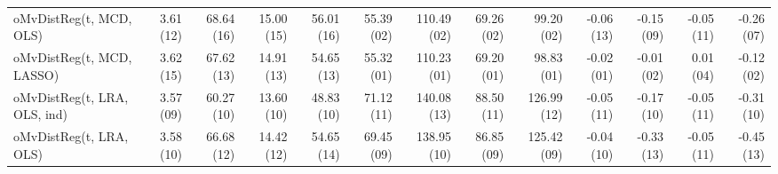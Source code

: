 \begin{tabular}{lrrrrrrrrrrrr}
oMvDistReg(t, MCD, OLS) & {\cellcolor[HTML]{D38E8E}} \color[HTML]{F1F1F1} 3.61 (12) & {\cellcolor[HTML]{CD5C5C}} \color[HTML]{F1F1F1} 68.64 (16) & {\cellcolor[HTML]{CD6060}} \color[HTML]{F1F1F1} 15.00 (15) & {\cellcolor[HTML]{CD5C5C}} \color[HTML]{F1F1F1} 56.01 (16) & {\cellcolor[HTML]{008080}} \color[HTML]{F1F1F1} 55.39 (02) & {\cellcolor[HTML]{028181}} \color[HTML]{F1F1F1} 110.49 (02) & {\cellcolor[HTML]{008080}} \color[HTML]{F1F1F1} 69.26 (02) & {\cellcolor[HTML]{038181}} \color[HTML]{F1F1F1} 99.20 (02) & {\cellcolor[HTML]{8ABABA}} \color[HTML]{000000} -0.06 (13) & {\cellcolor[HTML]{D7ADAD}} \color[HTML]{000000} -0.15 (09) & {\cellcolor[HTML]{D8BCBC}} \color[HTML]{000000} -0.05 (11) & {\cellcolor[HTML]{C0D0D0}} \color[HTML]{000000} -0.26 (07) \\
oMvDistReg(t, MCD, LASSO) & {\cellcolor[HTML]{D28888}} \color[HTML]{F1F1F1} 3.62 (15) & {\cellcolor[HTML]{CE6161}} \color[HTML]{F1F1F1} 67.62 (13) & {\cellcolor[HTML]{CE6464}} \color[HTML]{F1F1F1} 14.91 (13) & {\cellcolor[HTML]{CE6464}} \color[HTML]{F1F1F1} 54.65 (13) & {\cellcolor[HTML]{008080}} \color[HTML]{F1F1F1} 55.32 (01) & {\cellcolor[HTML]{008080}} \color[HTML]{F1F1F1} 110.23 (01) & {\cellcolor[HTML]{008080}} \color[HTML]{F1F1F1} 69.20 (01) & {\cellcolor[HTML]{008080}} \color[HTML]{F1F1F1} 98.83 (01) & {\cellcolor[HTML]{008080}} \color[HTML]{F1F1F1} -0.02 (01) & {\cellcolor[HTML]{429B9B}} \color[HTML]{F1F1F1} -0.01 (02) & {\cellcolor[HTML]{A9C7C7}} \color[HTML]{000000} 0.01 (04) & {\cellcolor[HTML]{289191}} \color[HTML]{F1F1F1} -0.12 (02) \\
oMvDistReg(t, LRA, OLS, ind) & {\cellcolor[HTML]{D8B6B6}} \color[HTML]{000000} 3.57 (09) & {\cellcolor[HTML]{D38D8D}} \color[HTML]{F1F1F1} 60.27 (10) & {\cellcolor[HTML]{D5A3A3}} \color[HTML]{000000} 13.60 (10) & {\cellcolor[HTML]{D38C8C}} \color[HTML]{F1F1F1} 48.83 (10) & {\cellcolor[HTML]{D7B0B0}} \color[HTML]{000000} 71.12 (11) & {\cellcolor[HTML]{DACDCD}} \color[HTML]{000000} 140.08 (13) & {\cellcolor[HTML]{D7B1B1}} \color[HTML]{000000} 88.50 (11) & {\cellcolor[HTML]{DBD2D2}} \color[HTML]{000000} 126.99 (12) & {\cellcolor[HTML]{6EAEAE}} \color[HTML]{F1F1F1} -0.05 (11) & {\cellcolor[HTML]{D6A7A7}} \color[HTML]{000000} -0.17 (10) & {\cellcolor[HTML]{D8BCBC}} \color[HTML]{000000} -0.05 (11) & {\cellcolor[HTML]{DBD5D5}} \color[HTML]{000000} -0.31 (10) \\
oMvDistReg(t, LRA, OLS) & {\cellcolor[HTML]{D6A6A6}} \color[HTML]{000000} 3.58 (10) & {\cellcolor[HTML]{CE6767}} \color[HTML]{F1F1F1} 66.68 (12) & {\cellcolor[HTML]{D17B7B}} \color[HTML]{F1F1F1} 14.42 (12) & {\cellcolor[HTML]{CE6464}} \color[HTML]{F1F1F1} 54.65 (14) & {\cellcolor[HTML]{D9C0C0}} \color[HTML]{000000} 69.45 (09) & {\cellcolor[HTML]{DBD2D2}} \color[HTML]{000000} 138.95 (10) & {\cellcolor[HTML]{D9BEBE}} \color[HTML]{000000} 86.85 (09) & {\cellcolor[HTML]{DCD9D9}} \color[HTML]{000000} 125.42 (09) & {\cellcolor[HTML]{5FA8A8}} \color[HTML]{F1F1F1} -0.04 (10) & {\cellcolor[HTML]{D28787}} \color[HTML]{F1F1F1} -0.33 (13) & {\cellcolor[HTML]{D8BCBC}} \color[HTML]{000000} -0.05 (11) & {\cellcolor[HTML]{D6AAAA}} \color[HTML]{000000} -0.45 (13) \\

\end{tabular}
